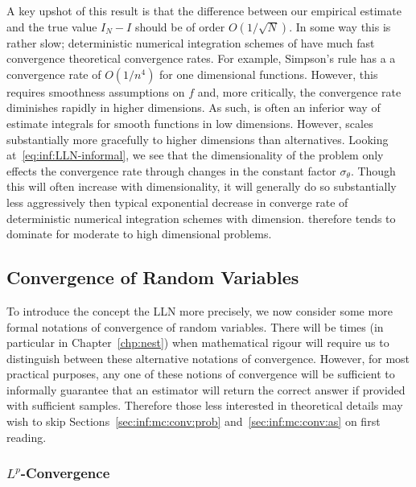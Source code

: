 A key upshot of this result is that the difference between our empirical estimate and the true value
$I_N-I$ should be of order $O(1/\sqrt{N})$.  In some way this is rather slow; deterministic numerical
integration schemes of have much fast convergence theoretical convergence rates.  For example,
Simpson's rule has a a convergence rate of $O(1/n^4)$ for one dimensional functions.  However, this
requires smoothness assumptions on $f$ and, more critically, the convergence rate diminishes rapidly
in higher dimensions.  As such, \mc is often an inferior way of estimate integrals for smooth functions
in low dimensions.  However, \mc scales substantially more gracefully to higher dimensions than
alternatives.  Looking at~\eqref{eq:inf:LLN-informal}, we see that the dimensionality of the problem
only effects the \mc convergence rate through changes in the constant factor $\sigma_{\theta}$.  Though
this will often increase with dimensionality, it will generally do so substantially less aggressively
then typical exponential decrease in converge rate of deterministic numerical integration schemes
with dimension.  \mc therefore tends to dominate for moderate to high dimensional problems.

\subsection{Convergence of Random Variables}
\label{sec:inf:mc:conv}

To introduce the concept the LLN more precisely, we now consider some more formal notations
of convergence of random variables.  There will be times (in particular in Chapter~\ref{chp:nest})
when mathematical rigour will require us to distinguish between these alternative notations of convergence.
However, for most practical purposes, any one of these notions of convergence will be sufficient 
to informally guarantee that an estimator will return the correct answer if provided 
with sufficient samples.  Therefore those less interested in theoretical details may wish to
skip Sections~\ref{sec:inf:mc:conv:prob} and~\ref{sec:inf:mc:conv:as} on first reading.

\subsubsection{$L^p$-Convergence}
\label{sec:inf:mc:conv:Lr}


